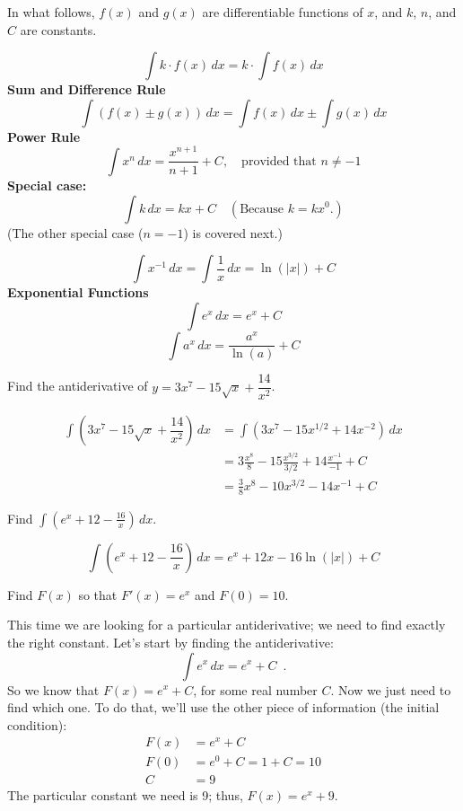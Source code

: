 \begin{theorem}
In what follows, $f(x)$ and $g(x)$ are differentiable functions of $x$, and $k$, $n$, and $C$ are constants.

$$\int k\cdot f(x)\, dx = k\cdot \int f(x)\, dx $$
{\bf Sum and Difference Rule}
$$\int(f(x)\pm g(x))\, dx = \int f(x)\, dx \pm \int g(x)\, dx $$
{\bf Power Rule}
$$\int x^n\, dx = \frac{x^{n+1}}{n+1} + C, \quad\text{provided that }n\neq -1$$
{\bf Special case:}
$$\int k\, dx = kx+C \quad (\text{Because }k=kx^0.)$$
(The other special case ($n=-1$) is covered next.)

$$\int x^{-1}\, dx = \int \frac{1}{x}\, dx = \ln(|x|)+C$$
{\bf Exponential Functions}
$$\int e^x\, dx = e^x+C$$
$$\int a^x\, dx = \frac{a^x}{\ln(a)} + C$$
\end{theorem}

\begin{example}
Find the antiderivative of $y=3x^7-15\sqrt{x} + \dfrac{14}{x^2}$.

\begin{solution}
\begin{align*}
\int\left(3x^7-15\sqrt{x} + \dfrac{14}{x^2}\right)\, dx &= \int\left(3x^7-15x^{1/2} + 14x^{-2}\right)\, dx \\
  &=  3\frac{x^8}{8} - 15 \frac{x^{3/2}}{3/2} + 14\frac{x^{-1}}{-1} + C\\
  &= \frac{3}{8}x^8 - 10x^{3/2} - 14x^{-1} + C
\end{align*}
\end{solution}\end{example}

\begin{example}
Find $\displaystyle\int\left(e^x+12-\frac{16}{x}\right)\, dx$.

\begin{solution}
  $$\int\left(e^x+12-\frac{16}{x}\right)\, dx =e^x+12x-16\ln(|x|)+C$$
\end{solution}\end{example}

\begin{example}
Find $F(x)$ so that $F'(x)=e^x$ and $F(0)=10$.

\begin{solution}
This time we are looking for a particular antiderivative; we need to find exactly the right constant. Let's start by finding the antiderivative:
$$\int e^x\, dx = e^x+C \enspace .$$
So we know that $F(x)=e^x+C$, for some real number $C$. Now we just need to find which one. To do that, we'll use the other piece of information (the initial condition):
\begin{align*}
F(x) &= e^x+C \\
F(0) &= e^0+C = 1+C=10 \\
C &= 9
\end{align*}
The particular constant we need is 9; thus, $F(x) = e^x + 9$.
\end{solution}\end{example}

